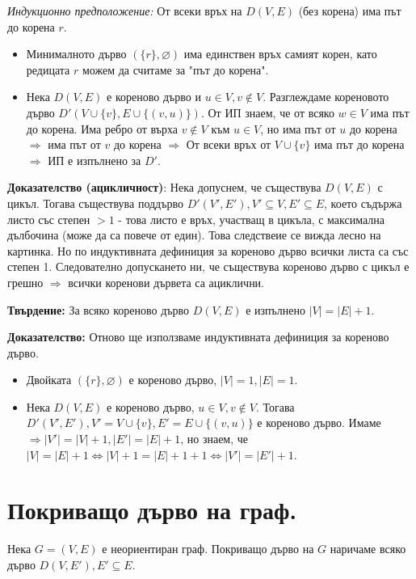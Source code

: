 \documentclass[fleqn,12pt]{article}
\begin{document}
\begin{flushleft}
\textit{Индукционно предположение:} От всеки връх на $D(V,E)$ (без корена) има път до корена $r$. 
\begin{itemize}
	\item Минималното дърво $(\{r\}, \varnothing)$ има единствен връх самият корен, като редицата $r$ можем да считаме за "път до корена".
	\item Нека $D(V,E)$ е кореново дърво и $u \in V, v \notin V$. Разглеждаме кореновото дърво $D'(V \cup \{v\}, E \cup \{ (v, u)\})$.
	От ИП знаем, че от всяко $w \in V$ има път до корена. Има ребро от върха $v \notin V$ към $u \in V$, но има път от $u$ до корена $\Rightarrow$
	има път от $v$ до корена $\Rightarrow$ От всеки връх от $V \cup \{v\}$ има път до корена $\Rightarrow$ ИП е изпълнено за $D'$.
\end{itemize}

\textbf{Доказателство (ацикличност)}: Нека допуснем, че съществува $D(V,E)$ с цикъл. Тогава съществува поддърво $D'(V', E'), V' \subseteq V, E' \subseteq E$, 
което съдържа листо със степен $>1$ - това листо е връх, участващ в цикъла, с максимална дълбочина (може да са повече от един). Това следствеие се вижда лесно на картинка. 
Но по индуктивната дефиниция за кореново дърво всички листа са със степен 1. Следователно допускането ни, че съществува кореново дърво с цикъл е грешно $\Rightarrow$ всички коренови дървета
са ациклични.
\vspace{10mm}

\textbf{Твърдение:} За всяко кореново дърво $D(V,E)$ е изпълнено $|V| = |E| + 1$.

\textbf{Доказателство:} Отново ще използваме индуктивната дефиниция за кореново дърво.
\begin{itemize}
	\item Двойката $(\{r\}, \varnothing)$ е кореново дърво, $|V| = 1, |E| = 1$.
	\item Нека $D(V,E)$ е кореново дърво, $u \in V, v \notin V$. Тогава $D'(V', E'), V' = V \cup \{v\}, E' = E \cup \{ (v, u)\}$ е кореново дърво.
	Имаме $\Rightarrow |V'| = |V| + 1, |E'| = |E| + 1$, но знаем, че $|V| = |E| + 1 \Leftrightarrow |V| + 1 = |E| + 1 + 1 \Leftrightarrow |V'| = |E'| + 1$.
\end{itemize}

\section{Покриващо дърво на граф.}
Нека $G = (V, E)$ е неориентиран граф. Покриващо дърво на $G$ наричаме всяко дърво $D(V, E'), E' \subseteq E$.
\vspace{10mm}


\end{flushleft}
\end{document}
